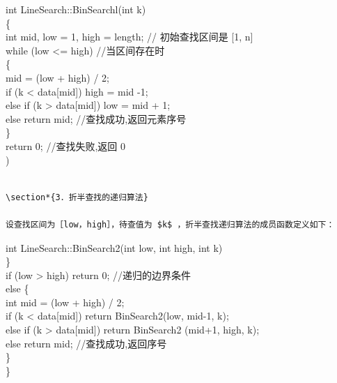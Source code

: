 \documentclass[10pt]{article}
\begin{document}
int LineSearch::BinSearchl(int k)\\
\{\\[0pt]
int mid, low = 1, high = length; // 初始查找区间是 [1, n]\\
while (low <= high) //当区间存在时\\
\{\\
mid = (low + high) / 2;\\[0pt]
if (k < data[mid]) high = mid -1;\\[0pt]
else if (k > data[mid]) low = mid + 1;\\
else return mid; //查找成功,返回元素序号\\
\}\\
return 0; //查找失败,返回 0\\
)

\begin{verbatim}

\section*{3．折半查找的递归算法}

设查找区间为［low，high］，待查值为 $k$ ，折半查找递归算法的成员函数定义如下：
\end{verbatim}

int LineSearch::BinSearch2(int low, int high, int k)\\
\}\\
if (low > high) return 0; //递归的边界条件\\
else \{\\
int mid = (low + high) / 2;\\[0pt]
if (k < data[mid]) return BinSearch2(low, mid-1, k);\\[0pt]
else if (k > data[mid]) return BinSearch2 (mid+1, high, k);\\
else return mid; //查找成功,返回序号\\
\}\\
\}
\end{document}
